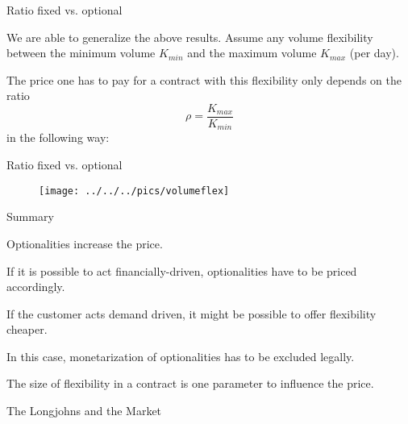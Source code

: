 
{Ratio fixed vs. optional}
\item<1-> We are able to generalize the above results. Assume any volume flexibility between the minimum volume $K_{min}$ and the maximum volume $K_{max}$ (per day).
\item<2-> The price one has to pay for a contract with this flexibility only depends on the ratio
$$
	\rho = \frac{K_{max}}{K_{min}}
$$
in the following way:

{Ratio fixed vs. optional}
\begin{figure}
	\centering
		\texttt{[image: ../../../pics/volumeflex]}
	\label{fig:volumeflex}
\end{figure}

{Summary}
\item<1-> Optionalities increase the price.
\item<2-> If it is possible to act financially-driven, optionalities have to be priced accordingly.
\item<3-> If the customer acts demand driven, it might be possible to offer flexibility cheaper.
\item<4-> In this case, monetarization of optionalities has to be excluded legally.
\item<5-> The size of flexibility in a contract is one parameter to influence the price.

{The Longjohns and the Market}

